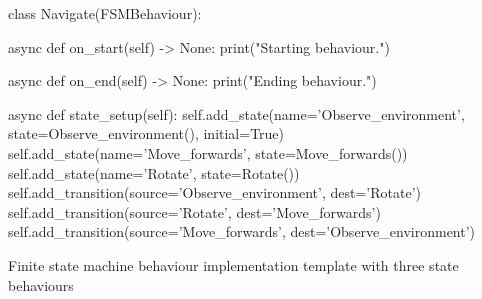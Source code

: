 \begin{frame}{\insertsubsection}
\end{frame}

\begin{frame}[fragile]{\insertsubsection}
    \begin{listing}
        \begin{mintedPython}
class Navigate(FSMBehaviour):

    async def on_start(self) -> None:
        print("Starting behaviour.")

    async def on_end(self) -> None:
        print("Ending behaviour.")

    async def state_setup(self):
        self.add_state(name='Observe_environment', state=Observe_environment(), initial=True)
        self.add_state(name='Move_forwards', state=Move_forwards())
        self.add_state(name='Rotate', state=Rotate())
        self.add_transition(source='Observe_environment', dest='Rotate')
        self.add_transition(source='Rotate', dest='Move_forwards')
        self.add_transition(source='Move_forwards', dest='Observe_environment')        
        \end{mintedPython}
        \caption{Finite state machine behaviour implementation template with three state behaviours}
    \end{listing}
\end{frame}

\begin{frame}{\insertsubsection}
\end{frame}

